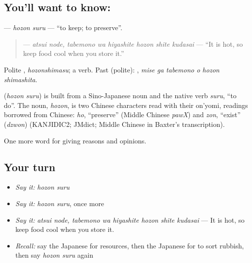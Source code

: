 \subsection*{You'll want to know: }
\textbf{} — \emph{hozon suru} — \textquotedblleft{}to keep; to preserve\textquotedblright{}.

\begin{quote}
\textbf{   } — \emph{atsui node, tabemono wa hiyashite hozon shite kudasai} — \textquotedblleft{}It is hot, so keep food cool when you store it.\textquotedblright{}
\end{quote}

Polite \textbf{}, \emph{hozonshimasu}; a  verb. Past (polite): \textbf{  }, \emph{mise ga tabemono o hozon shimashita}.

\begin{cousinweb}
\textbf{} (\emph{hozon suru}) is built from a Sino-Japanese noun and the native verb \emph{suru}, \textquotedblleft{}to do\textquotedblright{}. The noun, \emph{hozon}, is two Chinese characters read with their on'yomi, readings borrowed from Chinese: \emph{ho}, \textquotedblleft{}preserve\textquotedblright{} (Middle Chinese \emph{pawX}) and \emph{zon}, \textquotedblleft{}exist\textquotedblright{} (\emph{dzwon}) (KANJIDIC2; JMdict; Middle Chinese in Baxter's transcription).
\end{cousinweb}

\begin{grammarlens}[title={What you've built}]
One more word for giving reasons and opinions.
\end{grammarlens}

\subsection*{Your turn}
\begin{itemize}
\raggedright
  \item \emph{Say it:} \emph{hozon suru}
  \item \emph{Say it:} \emph{hozon suru}, once more
  \item \emph{Say it:} \emph{atsui node, tabemono wa hiyashite hozon shite kudasai} — It is hot, so keep food cool when you store it.
  \item \emph{Recall:} say the Japanese for resources, then the Japanese for to sort rubbish, then say \emph{hozon suru} again
\end{itemize}

